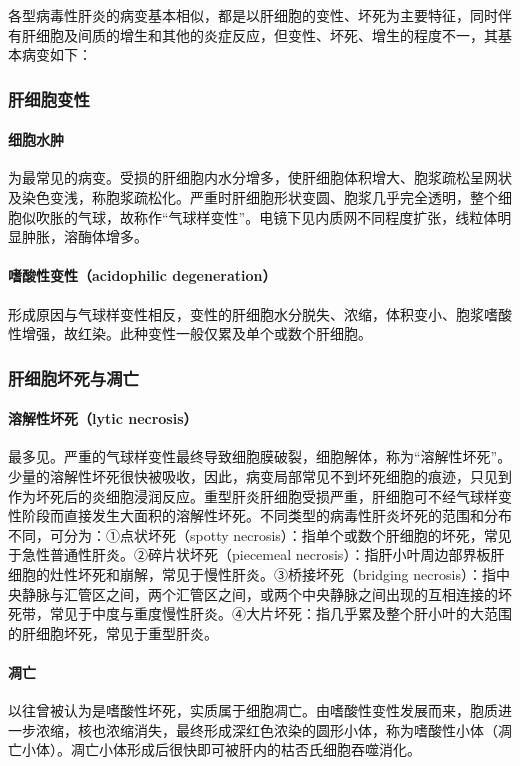 各型病毒性肝炎的病变基本相似，都是以肝细胞的变性、坏死为主要特征，同时伴有肝细胞及间质的增生和其他的炎症反应，但变性、坏死、增生的程度不一，其基本病变如下：

\subsubsection{肝细胞变性}

\paragraph{细胞水肿}
为最常见的病变。受损的肝细胞内水分增多，使肝细胞体积增大、胞浆疏松呈网状及染色变浅，称胞浆疏松化。严重时肝细胞形状变圆、胞浆几乎完全透明，整个细胞似吹胀的气球，故称作“气球样变性”。电镜下见内质网不同程度扩张，线粒体明显肿胀，溶酶体增多。

\paragraph{嗜酸性变性（acidophilic degeneration）}
形成原因与气球样变性相反，变性的肝细胞水分脱失、浓缩，体积变小、胞浆嗜酸性增强，故红染。此种变性一般仅累及单个或数个肝细胞。

\subsubsection{肝细胞坏死与凋亡}

\paragraph{溶解性坏死（lytic necrosis）}
最多见。严重的气球样变性最终导致细胞膜破裂，细胞解体，称为“溶解性坏死”。少量的溶解性坏死很快被吸收，因此，病变局部常见不到坏死细胞的痕迹，只见到作为坏死后的炎细胞浸润反应。重型肝炎肝细胞受损严重，肝细胞可不经气球样变性阶段而直接发生大面积的溶解性坏死。不同类型的病毒性肝炎坏死的范围和分布不同，可分为：①点状坏死（spotty
necrosis）：指单个或数个肝细胞的坏死，常见于急性普通性肝炎。②碎片状坏死（piecemeal
necrosis）：指肝小叶周边部界板肝细胞的灶性坏死和崩解，常见于慢性肝炎。③桥接坏死（bridging
necrosis）：指中央静脉与汇管区之间，两个汇管区之间，或两个中央静脉之间出现的互相连接的坏死带，常见于中度与重度慢性肝炎。④大片坏死：指几乎累及整个肝小叶的大范围的肝细胞坏死，常见于重型肝炎。

\paragraph{凋亡}
以往曾被认为是嗜酸性坏死，实质属于细胞凋亡。由嗜酸性变性发展而来，胞质进一步浓缩，核也浓缩消失，最终形成深红色浓染的圆形小体，称为嗜酸性小体（凋亡小体）。凋亡小体形成后很快即可被肝内的枯否氏细胞吞噬消化。

